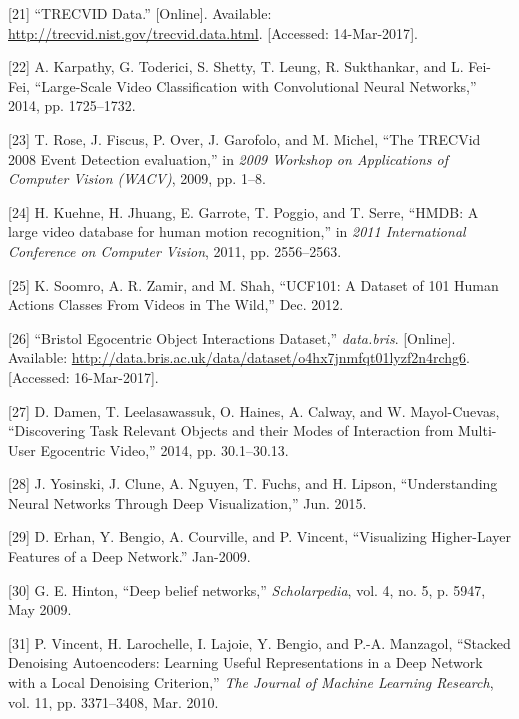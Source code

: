 \documentclass[A4paper,draft]{scrreprt}
\begin{document}
\hypertarget{ref-_TRECVIDData}{}
{[}21{]} ``TRECVID Data.'' {[}Online{]}. Available:
\url{http://trecvid.nist.gov/trecvid.data.html}. {[}Accessed:
14-Mar-2017{]}.

\hypertarget{ref-karpathy2014_LargeScaleVideoClassification}{}
{[}22{]} A. Karpathy, G. Toderici, S. Shetty, T. Leung, R. Sukthankar,
and L. Fei-Fei, ``Large-Scale Video Classification with Convolutional
Neural Networks,'' 2014, pp. 1725--1732.

\hypertarget{ref-rose2009_TRECVid2008Event}{}
{[}23{]} T. Rose, J. Fiscus, P. Over, J. Garofolo, and M. Michel, ``The
TRECVid 2008 Event Detection evaluation,'' in \emph{2009 Workshop on
Applications of Computer Vision (WACV)}, 2009, pp. 1--8.

\hypertarget{ref-kuehne2011_HMDBlargevideo}{}
{[}24{]} H. Kuehne, H. Jhuang, E. Garrote, T. Poggio, and T. Serre,
``HMDB: A large video database for human motion recognition,'' in
\emph{2011 International Conference on Computer Vision}, 2011, pp.
2556--2563.

\hypertarget{ref-soomro2012_UCF101Dataset101}{}
{[}25{]} K. Soomro, A. R. Zamir, and M. Shah, ``UCF101: A Dataset of 101
Human Actions Classes From Videos in The Wild,'' Dec. 2012.

\hypertarget{ref-_BristolEgocentricObject}{}
{[}26{]} ``Bristol Egocentric Object Interactions Dataset,''
\emph{data.bris}. {[}Online{]}. Available:
\url{http://data.bris.ac.uk/data/dataset/o4hx7jnmfqt01lyzf2n4rchg6}.
{[}Accessed: 16-Mar-2017{]}.

\hypertarget{ref-damen2014_DiscoveringTaskRelevant}{}
{[}27{]} D. Damen, T. Leelasawassuk, O. Haines, A. Calway, and W.
Mayol-Cuevas, ``Discovering Task Relevant Objects and their Modes of
Interaction from Multi-User Egocentric Video,'' 2014, pp. 30.1--30.13.

\hypertarget{ref-yosinski2015_UnderstandingNeuralNetworks}{}
{[}28{]} J. Yosinski, J. Clune, A. Nguyen, T. Fuchs, and H. Lipson,
``Understanding Neural Networks Through Deep Visualization,'' Jun. 2015.

\hypertarget{ref-erhan2009_VisualizingHigherLayerFeatures}{}
{[}29{]} D. Erhan, Y. Bengio, A. Courville, and P. Vincent,
``Visualizing Higher-Layer Features of a Deep Network.'' Jan-2009.

\hypertarget{ref-hinton2009_Deepbeliefnetworks}{}
{[}30{]} G. E. Hinton, ``Deep belief networks,'' \emph{Scholarpedia},
vol. 4, no. 5, p. 5947, May 2009.

\hypertarget{ref-vincent2010_StackedDenoisingAutoencoders}{}
{[}31{]} P. Vincent, H. Larochelle, I. Lajoie, Y. Bengio, and P.-A.
Manzagol, ``Stacked Denoising Autoencoders: Learning Useful
Representations in a Deep Network with a Local Denoising Criterion,''
\emph{The Journal of Machine Learning Research}, vol. 11, pp.
3371--3408, Mar. 2010.
\end{document}
